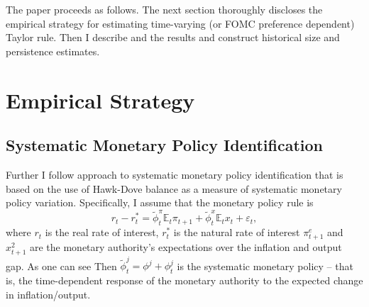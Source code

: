 \documentclass[11pt]{article}
\begin{document}




The paper proceeds as follows.
The next section thoroughly discloses the empirical strategy for estimating time-varying (or FOMC preference dependent) Taylor rule.
Then I describe and the results and construct historical size and persistence estimates.



\section{Empirical Strategy}
\subsection{Systematic Monetary Policy Identification}

Further I follow \citet{HIM2023} approach to systematic monetary policy identification that is based on the use of Hawk-Dove balance as a measure of systematic monetary policy variation. Specifically, I assume that the monetary policy rule is 
\begin{equation}
  r_t-r_t^*=\tilde\phi_{t}^\pi \mathbb{E}_t\pi_{t+1} +\tilde\phi_{t}^x \mathbb{E}_tx_{t}+\varepsilon_t,\label{eq:Taylor1}
\end{equation}
where $r_t$ is the real rate of interest, $r_t^*$ is the natural rate of interest $\pi_{t+1}^e$ and $x_{t+1}^2$ are the monetary authority's expectations over the inflation and output gap. As one can see Then $\tilde \phi_t^{j}=\phi^j+\phi_t^j$ is the systematic monetary policy -- that is, the time-dependent response of the monetary authority to the expected change in inflation/output. 
\end{document}
